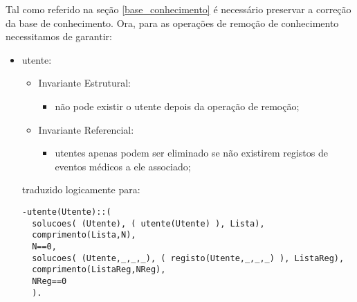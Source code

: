 \documentclass[
  oneside,
  10pt, a4paper,
  footinclude=true,
  headinclude=true,
  cleardoublepage=empty
]{scrbook}
\begin{document}
Tal como referido na seção \ref{base_conhecimento} é necessário preservar a correção da base de conhecimento. Ora, para as operações de remoção de conhecimento necessitamos de garantir:
\begin{itemize}

\item   utente:
\begin{itemize}
\item        Invariante Estrutural:
\begin{itemize}
\item           não pode existir o utente depois da operação de remoção;
\end{itemize}
\item        Invariante Referencial:
\begin{itemize}
\item         utentes apenas podem ser eliminado se não existirem registos de eventos médicos a ele associado;
\end{itemize}

\end{itemize}

traduzido logicamente para:
\begin{lstlisting}
-utente(Utente)::(
  solucoes( (Utente), ( utente(Utente) ), Lista),
  comprimento(Lista,N),
  N==0,
  solucoes( (Utente,_,_,_), ( registo(Utente,_,_,_) ), ListaReg),
  comprimento(ListaReg,NReg),
  NReg==0
  ).
\end{lstlisting}



\end{itemize}
\end{document}
